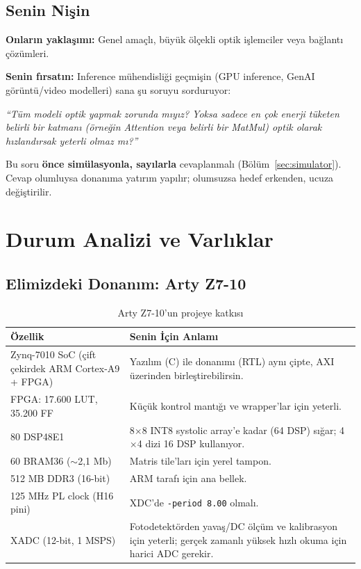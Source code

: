 \documentclass[11pt,a4paper]{article}
\begin{document}
\subsection{Senin Nişin}

\textbf{Onların yaklaşımı:} Genel amaçlı, büyük ölçekli optik işlemciler veya bağlantı çözümleri.

\textbf{Senin fırsatın:} Inference mühendisliği geçmişin (GPU inference, GenAI görüntü/video modelleri) sana şu soruyu sorduruyor:

\begin{center}
\large\textit{``Tüm modeli optik yapmak zorunda mıyız? Yoksa sadece en çok enerji tüketen belirli bir katmanı (örneğin Attention veya belirli bir MatMul) optik olarak hızlandırsak yeterli olmaz mı?''}
\end{center}

Bu soru \textbf{önce simülasyonla, sayılarla} cevaplanmalı (Bölüm~\ref{sec:simulator}). Cevap olumluysa donanıma yatırım yapılır; olumsuzsa hedef erkenden, ucuza değiştirilir.

\section{Durum Analizi ve Varlıklar}

\subsection{Elimizdeki Donanım: Arty Z7-10}

\begin{table}[h!]
\centering
\small
\begin{tabular}{@{}p{5.2cm}p{9cm}@{}}
\toprule
\textbf{Özellik} & \textbf{Senin İçin Anlamı} \\
\midrule
Zynq-7010 SoC (çift çekirdek ARM Cortex-A9 + FPGA) & Yazılım (C) ile donanımı (RTL) aynı çipte, AXI üzerinden birleştirebilirsin. \\
FPGA: 17.600 LUT, 35.200 FF & Küçük kontrol mantığı ve wrapper'lar için yeterli. \\
80 DSP48E1 & 8$\times$8 INT8 systolic array'e kadar (64 DSP) sığar; 4$\times$4 dizi 16 DSP kullanıyor. \\
60 BRAM36 ($\sim$2,1 Mb) & Matris tile'ları için yerel tampon. \\
512 MB DDR3 (16-bit) & ARM tarafı için ana bellek. \\
125 MHz PL clock (H16 pini) & XDC'de \texttt{-period 8.00} olmalı. \\
XADC (12-bit, 1 MSPS) & Fotodetektörden yavaş/DC ölçüm ve kalibrasyon için yeterli; gerçek zamanlı yüksek hızlı okuma için harici ADC gerekir. \\
\bottomrule
\end{tabular}
\caption{Arty Z7-10'un projeye katkısı}
\end{table}
\end{document}
